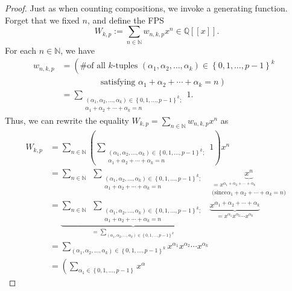 \begin{proof}
Just as when counting compositions, we invoke a generating function. Forget
that we fixed $n$, and define the FPS%
\[
W_{k,p}:=\sum_{n\in\mathbb{N}}w_{n,k,p}x^{n}\in\mathbb{Q}\left[  \left[
x\right]  \right]  .
\]
For each $n\in\mathbb{N}$, we have%
\begin{align*}
w_{n,k,p}  &  =\left(  \text{\# of all }k\text{-tuples }\left(  \alpha
_{1},\alpha_{2},\ldots,\alpha_{k}\right)  \in\left\{  0,1,\ldots,p-1\right\}
^{k}\text{ }\right. \\
&  \ \ \ \ \ \ \ \ \ \ \ \ \ \ \ \ \ \ \ \ \ \left.  \text{satisfying }%
\alpha_{1}+\alpha_{2}+\cdots+\alpha_{k}=n\right) \\
&  =\sum\limits_{\substack{\left(  \alpha_{1},\alpha_{2},\ldots,\alpha
_{k}\right)  \in\left\{  0,1,\ldots,p-1\right\}  ^{k};\\\alpha_{1}+\alpha
_{2}+\cdots+\alpha_{k}=n}}1.
\end{align*}
Thus, we can rewrite the equality $W_{k,p}=\sum_{n\in\mathbb{N}}w_{n,k,p}%
x^{n}$ as%
\begin{align*}
W_{k,p}  &  =\sum_{n\in\mathbb{N}}\left(  \sum\limits_{\substack{\left(
\alpha_{1},\alpha_{2},\ldots,\alpha_{k}\right)  \in\left\{  0,1,\ldots
,p-1\right\}  ^{k};\\\alpha_{1}+\alpha_{2}+\cdots+\alpha_{k}=n}}1\right)
x^{n}\\
&  =\sum_{n\in\mathbb{N}}\ \ \sum\limits_{\substack{\left(  \alpha_{1}%
,\alpha_{2},\ldots,\alpha_{k}\right)  \in\left\{  0,1,\ldots,p-1\right\}
^{k};\\\alpha_{1}+\alpha_{2}+\cdots+\alpha_{k}=n}}\ \ \underbrace{x^{n}%
}_{\substack{=x^{\alpha_{1}+\alpha_{2}+\cdots+\alpha_{k}}\\\text{(since
}\alpha_{1}+\alpha_{2}+\cdots+\alpha_{k}=n\text{)}}}\\
&  =\underbrace{\sum_{n\in\mathbb{N}}\ \ \sum\limits_{\substack{\left(
\alpha_{1},\alpha_{2},\ldots,\alpha_{k}\right)  \in\left\{  0,1,\ldots
,p-1\right\}  ^{k};\\\alpha_{1}+\alpha_{2}+\cdots+\alpha_{k}=n}}}%
_{=\sum\limits_{\left(  \alpha_{1},\alpha_{2},\ldots,\alpha_{k}\right)
\in\left\{  0,1,\ldots,p-1\right\}  ^{k}}}\ \ \underbrace{x^{\alpha_{1}%
+\alpha_{2}+\cdots+\alpha_{k}}}_{=x^{\alpha_{1}}x^{\alpha_{2}}\cdots
x^{\alpha_{k}}}\\
&  =\sum\limits_{\left(  \alpha_{1},\alpha_{2},\ldots,\alpha_{k}\right)
\in\left\{  0,1,\ldots,p-1\right\}  ^{k}}x^{\alpha_{1}}x^{\alpha_{2}}\cdots
x^{\alpha_{k}}\\
&  =\left(  \sum_{\alpha_{1}\in\left\{  0,1,\ldots,p-1\right\}  }x^{\alpha
}
\end{align*}
\end{proof}
